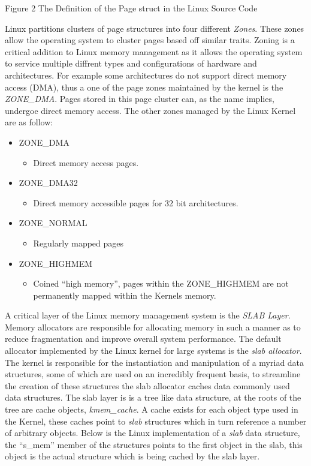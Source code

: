 
\begin{center}
Figure 2 The Definition of the Page struct in the Linux Source Code
\end{center}
	
	  \normalfont \indent Linux partitions clusters of page structures into four different \textit{Zones}. These zones allow the operating system to cluster pages based off similar traits. Zoning is a critical addition to Linux memory management as it allows the operating system to service multiple diffrent types and configurations of hardware and architectures. For example some architectures do not support direct memory access (DMA), thus a one of the page zones maintained by the kernel is the \textit{ZONE_DMA}. Pages stored in this page cluster can, as the name implies, undergoe direct memory access. The other zones managed by the Linux Kernel are as follow: 
	  
	\begin{itemize}
		\item ZONE\_DMA
			\begin{itemize}
				\item Direct memory access pages.
			\end{itemize}
		\item ZONE\_DMA32 
			\begin{itemize}
				\item Direct memory accessible pages for 32 bit architectures.
			\end{itemize}
		\item ZONE\_NORMAL
			\begin{itemize}
				\item Regularly mapped pages
			\end{itemize}
		\item ZONE\_HIGHMEM
			\begin{itemize}
				\item Coined “high memory”, pages within the ZONE\_HIGHMEM are not permanently mapped within the Kernels memory. 
			\end{itemize}
	\end{itemize} 

	\normalfont \indent A critical layer of the Linux memory management system is the  \textit{SLAB Layer}. Memory allocators are responsible for allocating memory in such a manner as to reduce fragmentation and improve overall system performance. The default allocator implemented by the Linux kernel for large systems is the \textit{slab allocator}. The kernel is responsible for the instantiation and manipulation of a myriad data structures, some of which are used on an incredibly frequent basis, to streamline the creation of these structures the slab allocator caches data commonly used data structures. The slab layer is is a tree like data structure, at the roots of the tree are cache objects, \textit{kmem_cache}. A cache exists for each object type used in the Kernel, these caches point to \textit{slab} structures which in turn reference a number of arbitrary objects. Below is the Linux implementation of a \textit{slab} data structure, the “s_mem” member of the structures points to the first object in the slab, this object is the actual structure which is being cached by the slab layer. 
	

